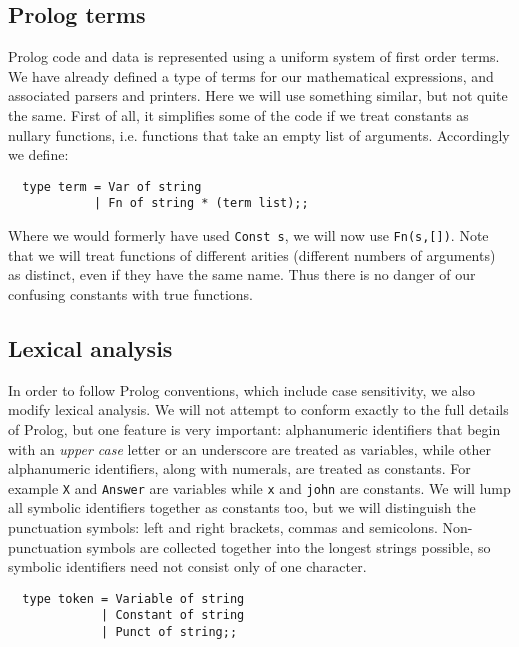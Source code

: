\subsection{Prolog terms}

Prolog code and data is represented using a uniform system of first order
terms. We have already defined a type of terms for our mathematical
expressions, and associated parsers and printers. Here we will use something
similar, but not quite the same. First of all, it simplifies some of the code
if we treat constants as nullary functions, i.e. functions that take an empty
list of arguments. Accordingly we define:

\begin{boxed}\begin{lstlisting}
  type term = Var of string
            | Fn of string * (term list);;
\end{lstlisting}\end{boxed}

Where we would formerly have used {\verb+Const s+}, we will now use
{\verb+Fn(s,[])+}. Note that we will treat functions of different arities
(different numbers of arguments) as distinct, even if they have the same name.
Thus there is no danger of our confusing constants with true functions.

\subsection{Lexical analysis}

In order to follow Prolog conventions, which include case sensitivity, we also
modify lexical analysis. We will not attempt to conform exactly to the full
details of Prolog, but one feature is very important: alphanumeric identifiers
that begin with an {\em upper case} letter or an underscore are treated as
variables, while other alphanumeric identifiers, along with numerals, are
treated as constants. For example {\verb+X+} and {\verb+Answer+} are variables
while {\verb+x+} and {\verb+john+} are constants. We will lump all symbolic
identifiers together as constants too, but we will distinguish the punctuation
symbols: left and right brackets, commas and semicolons. Non-punctuation
symbols are collected together into the longest strings possible, so symbolic
identifiers need not consist only of one character.

\begin{boxed}\begin{lstlisting}
  type token = Variable of string
             | Constant of string
             | Punct of string;;
\end{lstlisting}\end{boxed}

